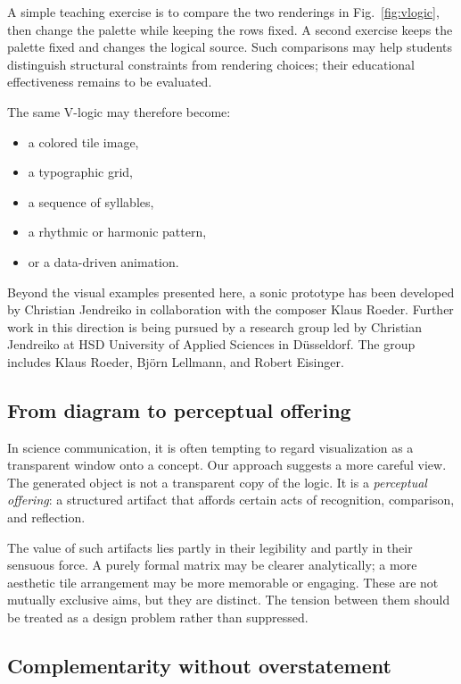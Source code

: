 \documentclass[
  10pt,
  twocolumn,
  aps,
  pra,
  showkeys,
  amsmath,amssymb,
  longbibliography
]{revtex4-2}
\begin{document}
A simple teaching exercise is to compare the two renderings in Fig.~\ref{fig:vlogic}, then change the palette while keeping the rows fixed. A second exercise keeps the palette fixed and changes the logical source. Such comparisons may help students distinguish structural constraints from rendering choices; their educational effectiveness remains to be evaluated.

\begin{samepage}
The same V-logic may therefore become:
\begin{itemize}
\item a colored tile image,
\item a typographic grid,
\item a sequence of syllables,
\item a rhythmic or harmonic pattern,
\item or a data-driven animation.
\end{itemize}
\end{samepage}
Beyond the visual examples presented here, a sonic prototype has been developed by Christian Jendreiko in collaboration with the composer Klaus Roeder. Further work in this direction is being pursued by a research group led by Christian Jendreiko at HSD University of Applied Sciences in D\"usseldorf. The group includes Klaus Roeder, Bj\"orn Lellmann, and Robert Eisinger.

\subsection{From diagram to perceptual offering}

In science communication, it is often tempting to regard visualization as a transparent window onto a concept. Our approach suggests a more careful view. The generated object is not a transparent copy of the logic. It is a \emph{perceptual offering}: a structured artifact that affords certain acts of recognition, comparison, and reflection.

The value of such artifacts lies partly in their legibility and partly in their sensuous force. A purely formal matrix may be clearer analytically; a more aesthetic tile arrangement may be more memorable or engaging. These are not mutually exclusive aims, but they are distinct. The tension between them should be treated as a design problem rather than suppressed.

\subsection{Complementarity without overstatement}
\end{document}
